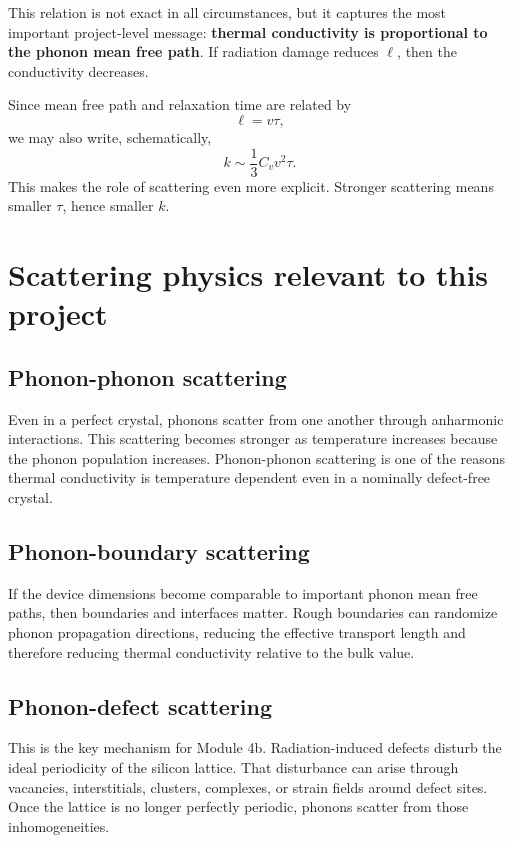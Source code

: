 \documentclass[11pt]{article}
\begin{document}
This relation is not exact in all circumstances, but it captures the most important project-level message: \textbf{thermal conductivity is proportional to the phonon mean free path}. If radiation damage reduces $\ell$, then the conductivity decreases.

Since mean free path and relaxation time are related by
\[
\ell = v\tau,
\]
we may also write, schematically,
\[
 k \sim \frac{1}{3} C_v v^2 \tau.
\]
This makes the role of scattering even more explicit. Stronger scattering means smaller $\tau$, hence smaller $k$.

\section{Scattering physics relevant to this project}

\subsection{Phonon-phonon scattering}

Even in a perfect crystal, phonons scatter from one another through anharmonic interactions. This scattering becomes stronger as temperature increases because the phonon population increases. Phonon-phonon scattering is one of the reasons thermal conductivity is temperature dependent even in a nominally defect-free crystal.

\subsection{Phonon-boundary scattering}

If the device dimensions become comparable to important phonon mean free paths, then boundaries and interfaces matter. Rough boundaries can randomize phonon propagation directions, reducing the effective transport length and therefore reducing thermal conductivity relative to the bulk value.

\subsection{Phonon-defect scattering}

This is the key mechanism for Module 4b. Radiation-induced defects disturb the ideal periodicity of the silicon lattice. That disturbance can arise through vacancies, interstitials, clusters, complexes, or strain fields around defect sites. Once the lattice is no longer perfectly periodic, phonons scatter from those inhomogeneities.
\end{document}
